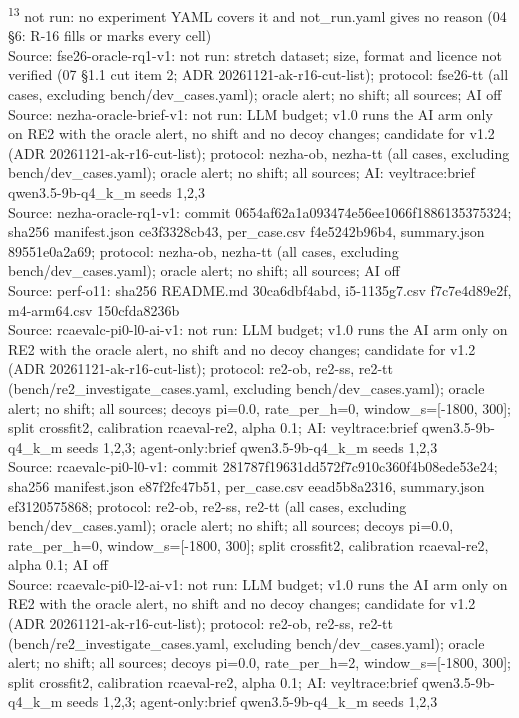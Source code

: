 \begin{table}[t]
\textsuperscript{13} not run: no experiment YAML covers it and not\_run.yaml gives no reason (04 \S{}6: R-16 fills or marks every cell)\\
Source: fse26-oracle-rq1-v1: not run: stretch dataset; size, format and licence not verified (07 \S{}1.1 cut item 2; ADR 20261121-ak-r16-cut-list); protocol: fse26-tt (all cases, excluding bench/dev\_cases.yaml); oracle alert; no shift; all sources; AI off\\
Source: nezha-oracle-brief-v1: not run: LLM budget; v1.0 runs the AI arm only on RE2 with the oracle alert, no shift and no decoy changes; candidate for v1.2 (ADR 20261121-ak-r16-cut-list); protocol: nezha-ob, nezha-tt (all cases, excluding bench/dev\_cases.yaml); oracle alert; no shift; all sources; AI: veyltrace:brief qwen3.5-9b-q4\_k\_m seeds 1,2,3\\
Source: nezha-oracle-rq1-v1: commit 0654af62a1a093474e56ee1066f1886135375324; sha256 manifest.json ce3f3328cb43, per\_case.csv f4e5242b96b4, summary.json 89551e0a2a69; protocol: nezha-ob, nezha-tt (all cases, excluding bench/dev\_cases.yaml); oracle alert; no shift; all sources; AI off\\
Source: perf-o11: sha256 README.md 30ca6dbf4abd, i5-1135g7.csv f7c7e4d89e2f, m4-arm64.csv 150cfda8236b\\
Source: rcaevalc-pi0-l0-ai-v1: not run: LLM budget; v1.0 runs the AI arm only on RE2 with the oracle alert, no shift and no decoy changes; candidate for v1.2 (ADR 20261121-ak-r16-cut-list); protocol: re2-ob, re2-ss, re2-tt (bench/re2\_investigate\_cases.yaml, excluding bench/dev\_cases.yaml); oracle alert; no shift; all sources; decoys pi=0.0, rate\_per\_h=0, window\_s=[-1800, 300]; split crossfit2, calibration rcaeval-re2, alpha 0.1; AI: veyltrace:brief qwen3.5-9b-q4\_k\_m seeds 1,2,3; agent-only:brief qwen3.5-9b-q4\_k\_m seeds 1,2,3\\
Source: rcaevalc-pi0-l0-v1: commit 281787f19631dd572f7c910c360f4b08ede53e24; sha256 manifest.json e87f2fc47b51, per\_case.csv eead5b8a2316, summary.json ef3120575868; protocol: re2-ob, re2-ss, re2-tt (all cases, excluding bench/dev\_cases.yaml); oracle alert; no shift; all sources; decoys pi=0.0, rate\_per\_h=0, window\_s=[-1800, 300]; split crossfit2, calibration rcaeval-re2, alpha 0.1; AI off\\
Source: rcaevalc-pi0-l2-ai-v1: not run: LLM budget; v1.0 runs the AI arm only on RE2 with the oracle alert, no shift and no decoy changes; candidate for v1.2 (ADR 20261121-ak-r16-cut-list); protocol: re2-ob, re2-ss, re2-tt (bench/re2\_investigate\_cases.yaml, excluding bench/dev\_cases.yaml); oracle alert; no shift; all sources; decoys pi=0.0, rate\_per\_h=2, window\_s=[-1800, 300]; split crossfit2, calibration rcaeval-re2, alpha 0.1; AI: veyltrace:brief qwen3.5-9b-q4\_k\_m seeds 1,2,3; agent-only:brief qwen3.5-9b-q4\_k\_m seeds 1,2,3\\

\end{table}
